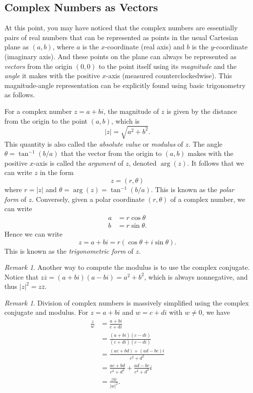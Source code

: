 \documentclass[11pt,oneside,reqno]{amsart}
\numberwithin{equation}{section}
\theoremstyle{definition}
\theoremstyle{remark}
\newtheorem{remark}[theorem]{Remark}
\begin{document}
\subsection{Complex Numbers as Vectors} At this point, you may have noticed that the complex numbers are essentially pairs of real numbers that can be represented as points in the usual Cartesian plane as $(a, b)$, where $a$ is 
the $x$-coordinate (real axis) and $b$ is the $y$-coordinate (imaginary axis). And these points on the plane can always be represented as \textit{vectors} from the origin $(0,0)$ to the point itself using its 
\textit{magnitude} and the \textit{angle} it makes with the positive $x$-axis (measured counterclockedwise). This magnitude-angle representation can be explicitly found using basic trigonometry as follows. 

For a complex number $z = a + bi$, the magnitude of $z$ is given by the distance from the origin to the point $(a, b)$, which is
\[|z| = \sqrt{a^2 + b^2}.\]
This quantity is also called the \textit{absolute value} or \textit{modulus} of $z$. The angle $\theta = \tan^{-1}(b/a)$ that the vector from the origin to $(a, b)$ makes with the positive $x$-axis is called the \textit{argument} of $z$, denoted $\arg(z)$.
It follows that we can write $z$ in the form
\[z = (r,\theta)\]
where $r = |z|$ and $\theta = \arg(z) = \tan^{-1}(b/a)$. This is known as the \textit{polar form} of $z$. Conversely, given a polar coordinate $(r, \theta)$ of a complex number, 
we can write 
\begin{align*}
    a &= r\cos\theta \\
    b &= r\sin\theta.
\end{align*}
Hence we can write 
\[z = a+bi = r(\cos\theta + i\sin\theta).\]
This is known as the \textit{trigonometric form} of $z$. 
\begin{remark}
    Another way to compute the modulus is to use the complex conjugate. Notice that $z\overline{z} = (a + bi)(a - bi) = a^2 + b^2$, which is always nonnegative, and thus $|z|^2 = z\overline{z}$.
\end{remark}

\begin{remark}
    Division of complex numbers is massively simplified using the complex conjugate and modulus. For $z = a + bi$ and $w = c + di$ with $w \neq 0$, we have
\begin{align*}
    \frac{z}{w} &= \frac{a + bi}{c + di} \\
    &= \frac{(a + bi)(c - di)}{(c + di)(c - di)} \\
    &= \frac{(ac + bd) +    (ad - bc)i}{c^2 + d^2} \\
    &= \frac{ac + bd}{c^2 + d^2} + \frac{ad - bc}{c^2 + d^2}i \\
    &= \frac{z\overline{w}}{|w|^2}.
\end{align*}
\end{remark}
\end{document}
